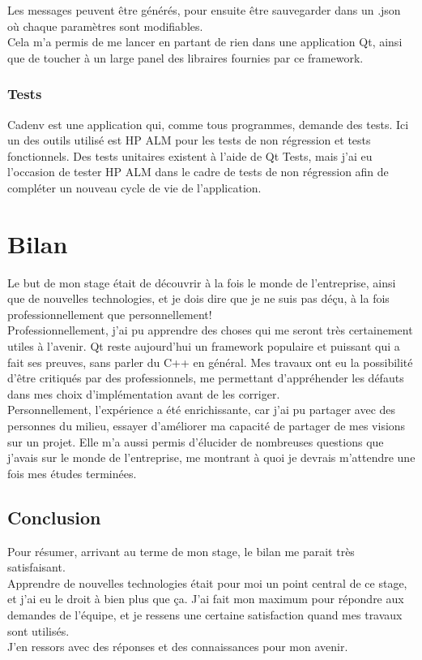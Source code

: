 \documentclass{rapport}
\begin{document}
Les messages peuvent être générés, pour ensuite être sauvegarder dans un .json où chaque paramètres sont modifiables.\\

Cela m'a permis de me lancer en partant de rien dans une application Qt, ainsi que de toucher à un large panel des libraires fournies par ce framework.

\subsubsection{Tests}

Cadenv est une application qui, comme tous programmes, demande des tests. Ici un des outils utilisé est HP ALM pour les tests de non régression et tests fonctionnels. Des tests unitaires existent à l'aide de Qt Tests, mais j'ai eu l'occasion de tester HP ALM dans le cadre de tests de non régression afin de compléter un nouveau cycle de vie de l'application.

\newpage

\section{Bilan}

Le but de mon stage était de découvrir à la fois le monde de l'entreprise, ainsi que de nouvelles technologies, et je dois dire que je ne suis pas déçu, à la fois professionnellement que personnellement!\\

Professionnellement, j'ai pu apprendre des choses qui me seront très certainement utiles à l'avenir. Qt reste aujourd'hui un framework populaire et puissant qui a fait ses preuves, sans parler du C++ en général. Mes travaux ont eu la possibilité d'être critiqués par des professionnels, me permettant d'appréhender les défauts dans mes choix d'implémentation avant de les corriger. \\

Personnellement, l'expérience a été enrichissante, car j'ai pu partager avec des personnes du milieu, essayer d'améliorer ma capacité de partager de mes visions sur un projet. Elle m'a aussi permis d'élucider de nombreuses questions que j'avais sur le monde de l'entreprise, me montrant à quoi je devrais m'attendre une fois mes études terminées.

\subsection*{Conclusion}
Pour résumer, arrivant au terme de mon stage, le bilan me parait très satisfaisant. \\
Apprendre de nouvelles technologies était pour moi un point central de ce stage, et j'ai eu le droit à bien plus que ça. J'ai fait mon maximum pour répondre aux demandes de l'équipe, et je ressens une certaine satisfaction quand mes travaux sont utilisés. \\
J'en ressors avec des réponses et des connaissances pour mon avenir.
\end{document}
